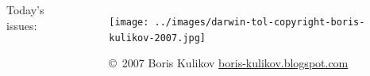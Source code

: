 
\begin{noheadline}
\begin{frame}
    \begin{columns}[c]
            Today's issues:
            \tableofcontents[subsectionstyle=hide]
            \begin{figure}
                \begin{center}
                \texttt{[image: ../images/darwin-tol-copyright-boris-kulikov-2007.jpg]}
                \caption{\tiny \copyright~2007 Boris Kulikov \href{http://boris-kulikov.blogspot.com/}{boris-kulikov.blogspot.com}}
                \end{center}
            \end{figure}
    \end{columns}
\end{frame}
\end{noheadline}

